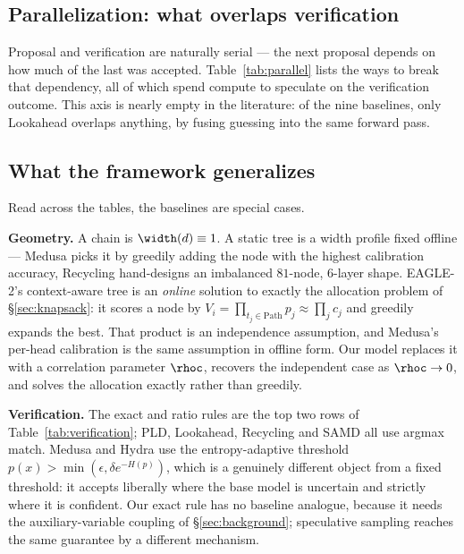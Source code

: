 \documentclass{article} %
\makeatletter
\newenvironment{ai}
  {\color{lightgray}%
   \@ifpackageloaded{caption}{\captionsetup{font={color=lightgray}}}{}%
   \let\ai@savedfloatreset\@floatboxreset
   \g@addto@macro\@floatboxreset{\color{lightgray}}}
  {\global\let\@floatboxreset\ai@savedfloatreset}
\makeatother
\begin{document}
\begin{ai}
\subsection{Parallelization: what overlaps verification}
\label{sec:parallel}

Proposal and verification are naturally serial --- the next proposal depends on
how much of the last was accepted. Table~\ref{tab:parallel} lists the ways to
break that dependency, all of which spend compute to speculate on the
verification outcome. This axis is nearly empty in the literature: of the nine
baselines, only Lookahead overlaps anything, by fusing guessing into the same
forward pass.

\begin{table}[t]
  \centering
  \caption{Parallelization schemes. ``extra compute'' is the cost multiplier
  relative to serial drafting; $\nprop$ is the number of proposed tokens and
  $\budget$ the node budget.}
  \label{tab:parallel}
  
\end{table}

\subsection{What the framework generalizes}
\label{sec:generalize}

Read across the tables, the baselines are special cases.

\textbf{Geometry.} A chain is $\width(d) \equiv 1$. A static tree is a width
profile fixed offline --- Medusa picks it by greedily adding the node with the
highest calibration accuracy, Recycling hand-designs an imbalanced $81$-node,
$6$-layer shape. EAGLE-2's context-aware tree is an \emph{online} solution to
exactly the allocation problem of \S\ref{sec:knapsack}: it scores a node by
$V_i = \prod_{t_j \in \mathrm{Path}} p_j \approx \prod_j c_j$ and greedily
expands the best. That product is an independence assumption, and Medusa's
per-head calibration is the same assumption in offline form. Our model replaces
it with a correlation parameter $\rhoc$, recovers the independent case as
$\rhoc \to 0$, and solves the allocation exactly rather than greedily.

\textbf{Verification.} The exact and ratio rules are the top two rows of
Table~\ref{tab:verification}; PLD, Lookahead, Recycling and SAMD all use argmax
match. Medusa and Hydra use the entropy-adaptive threshold
$p(x) > \min(\epsilon, \delta e^{-H(p)})$, which is a genuinely different object
from a fixed threshold: it accepts liberally where the base model is uncertain
and strictly where it is confident. Our exact rule has no baseline analogue,
because it needs the auxiliary-variable coupling of \S\ref{sec:background};
speculative sampling reaches the same guarantee by a different mechanism.


\end{ai}
\end{document}
